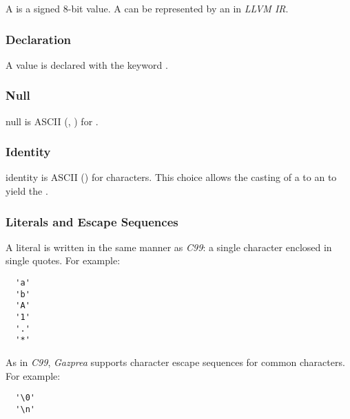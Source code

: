 \documentclass[types.tex]{subfiles}
\begin{document}
A  is a signed 8-bit value. A  can be represented by an 
in \textit{LLVM IR}.

\subsubsection{Declaration}
\label{sssec:character_decl}
A  value is declared with the keyword .

\subsubsection{Null}
\label{sssec:character_null}
\textsf{null} is ASCII  (, ) for .

\subsubsection{Identity}
\label{sssec:character_ident}
\textsf{identity} is ASCII  () for characters. This choice allows the casting
of a  to an  to yield the  .

\subsubsection{Literals and Escape Sequences}
\label{sssec:character_lit}
A  literal is written in the same manner as \textit{C99}: a single character
enclosed in single quotes. For example:
\begin{lstlisting}
  'a'
  'b'
  'A'
  '1'
  '.'
  '*'
\end{lstlisting}

As in \textit{C99}, \textit{Gazprea} supports character escape sequences for common characters. For
example:
\begin{lstlisting}
  '\0'
  '\n'
\end{lstlisting}
\end{document}
